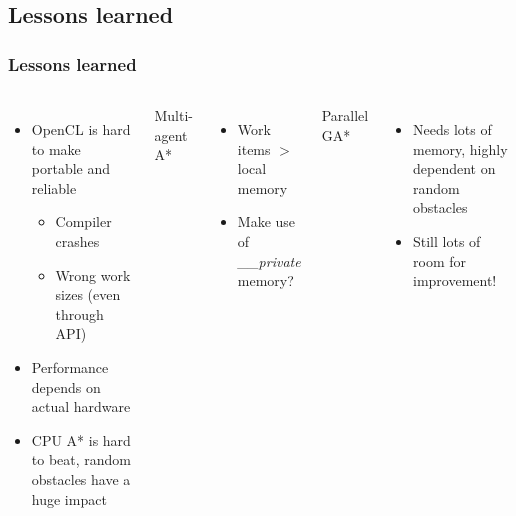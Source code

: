 \documentclass{beamer}
\begin{document}
\subsection{Lessons learned}
\begin{frame}
    \frametitle{Lessons learned}
    \begin{columns}
        \begin{itemize}
            \item OpenCL is hard to make portable and reliable
            \begin{itemize}
                \item Compiler crashes
                \item Wrong work sizes (even through API)
            \end{itemize}
            \item Performance depends on actual hardware
            \item CPU A* is hard to beat, random obstacles have a huge impact
        \end{itemize}
        
        Multi-agent A*
        \begin{itemize}
            \item Work items \(>\) local memory
            \item Make use of \emph{\_\_private} memory?
        \end{itemize}
        
        Parallel GA*
        \begin{itemize}
            \item Needs lots of memory, highly dependent on random obstacles
            \item Still lots of room for improvement!
        \end{itemize}
    \end{columns}
\end{frame}
\end{document}
